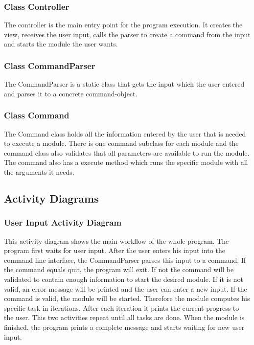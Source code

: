 \documentclass[parskip=full]{scrartcl}
\begin{document}
\subsubsection{Class Controller} 
The controller is the main entry point for the program execution. 
It creates the view, receives the user input, calls the parser to create a command from the input and starts the module the user wants.

\subsubsection{Class CommandParser}
The CommandParser is a static class that gets the input which the user entered and parses it to a concrete command-object.

\subsubsection{Class Command}
The Command class holds all the information entered by the user that is needed to execute a module.
There is one command subclass for each module and the command class also validates that all parameters are available to run the module.
The command also has a execute method which runs the specific module with all the arguments it needs.


\subsection{Activity Diagrams}

\subsubsection{User Input Activity Diagram}

This activity diagram shows the main workflow of the whole program.
The program first waits for user input.
After the user enters his input into the command line interface, the CommandParser parses this input to a command.
If the command equals quit, the program will exit.
If not the command will be validated to contain enough information to start the desired module.
If it is not valid, an error message will be printed and the user can enter a new input.
If the command is valid, the module will be started.
Therefore the module computes his specific task in iterations.
After each iteration it prints the current progress to the user.
This two activities repeat until all tasks are done.
When the module is finished, the program prints a complete message and starts waiting for new user input.
\end{document}
